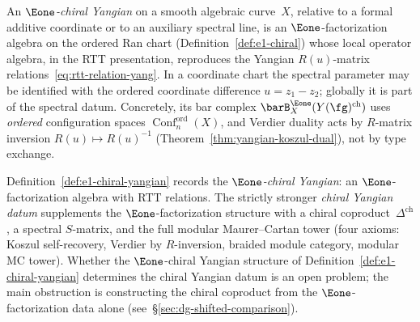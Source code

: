 \begin{definition}
\label{def:e1-chiral-yangian}
An \emph{$\Eone$-chiral Yangian} on a smooth algebraic curve~$X$,
relative to a formal additive coordinate or to an auxiliary spectral
line, is an $\Eone$-factorization algebra on the ordered Ran chart
(Definition~\ref{def:e1-chiral}) whose local operator algebra, in
the RTT presentation, reproduces the Yangian $R(u)$-matrix
relations~\eqref{eq:rtt-relation-yang}.  In a coordinate chart the
spectral parameter may be identified with the ordered coordinate
difference $u=z_1-z_2$; globally it is part of the spectral datum.
Concretely, its bar complex
$\barB^{\Eone}_X(Y(\fg)^{\mathrm{ch}})$ uses \emph{ordered}
configuration spaces $\operatorname{Conf}^{\mathrm{ord}}_n(X)$,
and Verdier duality acts by $R$-matrix inversion
$R(u) \mapsto R(u)^{-1}$
(Theorem~\ref{thm:yangian-koszul-dual}), not by type exchange.
\end{definition}

\begin{remark}
\label{rem:e1-chiral-yangian-vs-datum}
Definition~\ref{def:e1-chiral-yangian} records the
\emph{$\Eone$-chiral Yangian}: an $\Eone$-factorization
algebra with RTT relations. The strictly stronger
\emph{chiral Yangian datum} supplements the
$\Eone$-factorization structure with a chiral
coproduct~$\Delta^{\mathrm{ch}}$, a spectral
$S$-matrix, and the full modular Maurer--Cartan tower
(four axioms: Koszul self-recovery, Verdier by
$R$-inversion, braided module category, modular MC tower).
Whether the $\Eone$-chiral Yangian structure of
Definition~\ref{def:e1-chiral-yangian} determines the
chiral Yangian datum is an open problem; the main
obstruction is constructing the chiral coproduct from the
$\Eone$-factorization data alone
(see~\S\ref{sec:dg-shifted-comparison}).
\end{remark}

